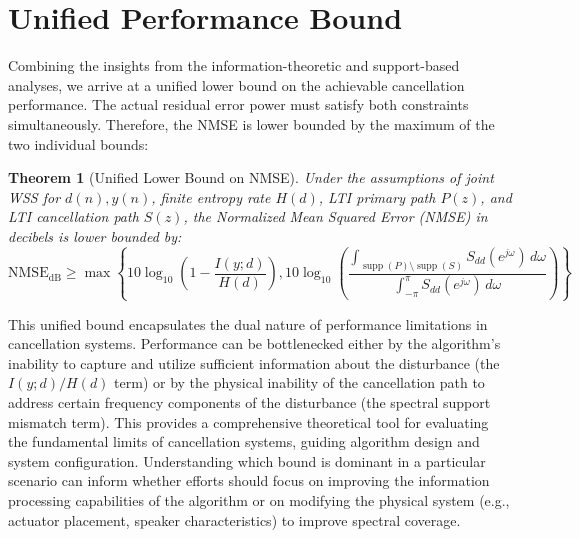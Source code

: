 \documentclass{article}
\newtheorem{theorem}{Theorem}
\begin{document}
\section{Unified Performance Bound}

Combining the insights from the information-theoretic and support-based analyses, we arrive at a unified lower bound on the achievable cancellation performance. The actual residual error power must satisfy both constraints simultaneously. Therefore, the NMSE is lower bounded by the maximum of the two individual bounds:

\begin{theorem}[Unified Lower Bound on NMSE]
Under the assumptions of joint WSS for \( d(n), y(n) \), finite entropy rate \( H(d) \), LTI primary path \( P(z) \), and LTI cancellation path \( S(z) \), the Normalized Mean Squared Error (NMSE) in decibels is lower bounded by:
\begin{equation}
\mathrm{NMSE}_{\mathrm{dB}} \geq \max \left\{ 10 \log_{10} \left( 1 - \frac{I(y; d)}{H(d)} \right), 10 \log_{10} \left( \frac{\int_{\operatorname{supp}(P) \setminus \operatorname{supp}(S)} S_{dd}(e^{j\omega}) \, d\omega}{\int_{-\pi}^{\pi} S_{dd}(e^{j\omega}) \, d\omega} \right) \right\}
\label{eq:unified_bound}
\end{equation}
\end{theorem}
This unified bound encapsulates the dual nature of performance limitations in cancellation systems. Performance can be bottlenecked either by the algorithm's inability to capture and utilize sufficient information about the disturbance (the \( I(y;d) / H(d) \) term) or by the physical inability of the cancellation path to address certain frequency components of the disturbance (the spectral support mismatch term). This provides a comprehensive theoretical tool for evaluating the fundamental limits of cancellation systems, guiding algorithm design and system configuration. Understanding which bound is dominant in a particular scenario can inform whether efforts should focus on improving the information processing capabilities of the algorithm or on modifying the physical system (e.g., actuator placement, speaker characteristics) to improve spectral coverage.
\end{document}

